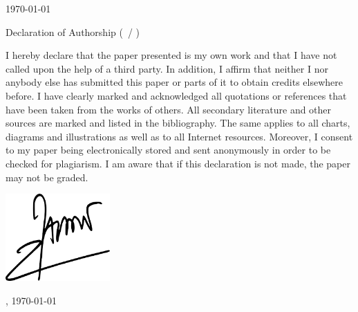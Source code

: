 \documentclass[
    12pt	%
    ]{article}
\begin{document}
  
\begin{titlepage}
\begin{center}

{\Large \EMBACourse}
\vspace{1cm}

{\large \EMBALecturer}
\vspace{2cm}

{\EMBATestType}

{\EMBAParticipant}

{\EMBAClass}
\vspace{1cm}

\today

\vspace{2cm}

Declaration of Authorship (\EMBACourse\ / \EMBATestType)
\vspace{0.5cm}

I hereby declare that the paper presented is my own work and that I
have not called upon the help of a third party. In addition, I affirm
that neither I nor anybody else has submitted this paper or parts of
it to obtain credits elsewhere before. I have clearly marked and
acknowledged all quotations or references that have been taken from
the works of others. All secondary literature and other sources are
marked and listed in the bibliography. The same applies to all charts,
diagrams and illustrations as well as to all Internet
resources. Moreover, I consent to my paper being electronically stored
and sent anonymously in order to be checked for plagiarism.  I am
aware that if this declaration is not made, the paper may not be
graded.

\vspace{1cm}
\includegraphics[width=4cm] {img/signature.png}
\vspace{.1cm}

{\EMBAParticipant}

{\EMBALocation, \today}

\end{center}

\end{titlepage}
\end{document}
